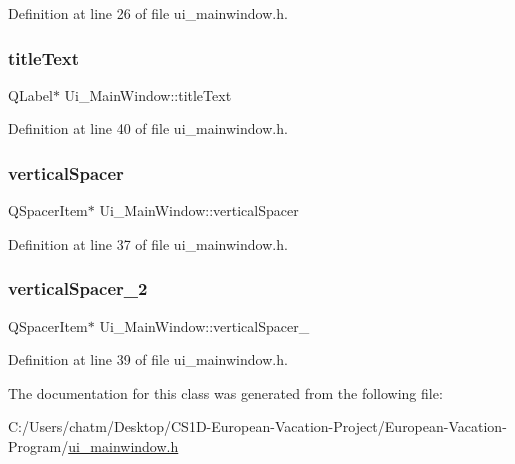 Definition at line 26 of file ui\+\_\+mainwindow.\+h.

\mbox{\label{class_ui___main_window_a892390c810f5c91a93dc843de90cf433}} 
\subsubsection{\texorpdfstring{titleText}{titleText}}
{\footnotesize\ttfamily Q\+Label$\ast$ Ui\+\_\+\+Main\+Window\+::title\+Text}



Definition at line 40 of file ui\+\_\+mainwindow.\+h.

\mbox{\label{class_ui___main_window_a8384329c3663ff274e926a12024aab52}} 
\subsubsection{\texorpdfstring{verticalSpacer}{verticalSpacer}}
{\footnotesize\ttfamily Q\+Spacer\+Item$\ast$ Ui\+\_\+\+Main\+Window\+::vertical\+Spacer}



Definition at line 37 of file ui\+\_\+mainwindow.\+h.

\mbox{\label{class_ui___main_window_adc1f5fdd97fb3729999c56902d0fa591}} 
\subsubsection{\texorpdfstring{verticalSpacer\_2}{verticalSpacer\_2}}
{\footnotesize\ttfamily Q\+Spacer\+Item$\ast$ Ui\+\_\+\+Main\+Window\+::vertical\+Spacer\+\_}



Definition at line 39 of file ui\+\_\+mainwindow.\+h.



The documentation for this class was generated from the following file\+:\begin{DoxyCompactItemize}
\item 
C\+:/\+Users/chatm/\+Desktop/\+C\+S1\+D-\/\+European-\/\+Vacation-\/\+Project/\+European-\/\+Vacation-\/\+Program/\mbox{\hyperlink{ui__mainwindow_8h}{ui\+\_\+mainwindow.\+h}}\end{DoxyCompactItemize}
